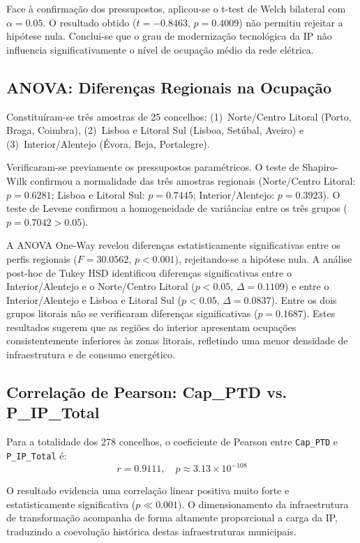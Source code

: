 \documentclass[conference]{IEEEtran}
\begin{document}
Face à confirmação dos pressupostos, aplicou-se o t-test de 
Welch bilateral com $\alpha = 0.05$. O resultado obtido 
($t = -0.8463$, $p = 0.4009$) não permitiu rejeitar a 
hipótese nula. Conclui-se que o grau de modernização 
tecnológica da IP não influencia significativamente 
o nível de ocupação médio da rede elétrica.

\subsection{ANOVA: Diferenças Regionais na Ocupação}

Constituíram-se três amostras de 25 concelhos: (1)~Norte/Centro Litoral (Porto, Braga, Coimbra), (2)~Lisboa e Litoral Sul (Lisboa, Setúbal, Aveiro) e (3)~Interior/Alentejo (Évora, Beja, Portalegre).

Verificaram-se previamente os pressupostos paramétricos. O teste de Shapiro-Wilk confirmou a normalidade das três amostras regionais (Norte/Centro Litoral: $p = 0.6281$; Lisboa e Litoral Sul: $p = 0.7445$; Interior/Alentejo: $p = 0.3923$). O teste de Levene confirmou a homogeneidade de variâncias entre os três grupos ($p = 0.7042 > 0.05$).

A ANOVA One-Way revelou diferenças estatisticamente 
significativas entre os perfis regionais 
($F = 30.0562$, $p < 0.001$), rejeitando-se a hipótese 
nula. A análise post-hoc de Tukey HSD identificou 
diferenças significativas entre o Interior/Alentejo 
e o Norte/Centro Litoral ($p < 0.05$, $\Delta = 0.1109$) 
e entre o Interior/Alentejo e Lisboa e Litoral Sul 
($p < 0.05$, $\Delta = 0.0837$). Entre os dois grupos 
litorais não se verificaram diferenças significativas 
($p = 0.1687$). Estes resultados sugerem que as regiões 
do interior apresentam ocupações consistentemente 
inferiores às zonas litorais, refletindo uma menor 
densidade de infraestrutura e de consumo energético.

\subsection{Correlação de Pearson: Cap\_PTD vs. P\_IP\_Total}

Para a totalidade dos 278 concelhos, o coeficiente de Pearson entre \texttt{Cap\_PTD} e \texttt{P\_IP\_Total} é:
\[
r = 0.9111, \quad p \approx 3.13 \times 10^{-108}
\]

O resultado evidencia uma correlação linear positiva muito forte e estatisticamente significativa ($p \ll 0.001$). O dimensionamento da infraestrutura de transformação acompanha de forma altamente proporcional a carga da IP, traduzindo a coevolução histórica destas infraestruturas municipais.
\end{document}
